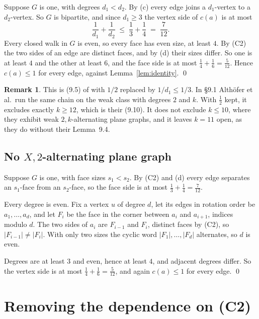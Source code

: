 \documentclass[11pt,a4paper]{amsart}
\theoremstyle{plain}
\theoremstyle{definition}
\newtheorem{remark}[theorem]{Remark}
\begin{document}
Suppose $G$ is one, with degrees $d_1 < d_2$. By (c) every edge joins a
$d_1$-vertex to a $d_2$-vertex. So $G$ is bipartite, and since $d_1 \ge 3$ the
vertex side of $c(a)$ is at most
\[
  \frac{1}{d_1} + \frac{1}{d_2} \;\le\; \frac13 + \frac14 \;=\; \frac{7}{12}.
\]
Every closed walk in $G$ is even, so every face has even size, at least $4$. By
(C2) the two sides of an edge are distinct faces, and by (d) their sizes differ.
So one is at least $4$ and the other at least $6$, and the face side is at most
$\tfrac14 + \tfrac16 = \tfrac{5}{12}$. Hence $c(a) \le 1$ for every edge,
against Lemma~\ref{lem:identity}. \qed

\begin{remark}
This is (9.5) of \cite{AHSSV2015} with $1/2$ replaced by $1/d_1 \le 1/3$. In
\S9.1 Alth\"ofer et al.\ run the same chain on the weak class with degrees $2$
and $k$. With $\tfrac12$ kept, it excludes exactly $k \ge 12$, which is their
(9.10). It does not exclude $k \le 10$, where they exhibit weak
$2,k$-alternating plane graphs, and it leaves $k = 11$ open, as they do without
their Lemma~9.4.
\end{remark}

\subsection{No $X,2$-alternating plane graph}\label{sec:halftwo}

Suppose $G$ is one, with face sizes $s_1 < s_2$. By (C2) and (d) every edge
separates an $s_1$-face from an $s_2$-face, so the face side is at most
$\tfrac13 + \tfrac14 = \tfrac{7}{12}$.

Every degree is even. Fix a vertex $u$ of degree $d$, let its edges in rotation
order be $a_1,\dots,a_d$, and let $F_i$ be the face in the corner between $a_i$
and $a_{i+1}$, indices modulo $d$. The two sides of $a_i$ are $F_{i-1}$ and
$F_i$, distinct faces by (C2), so $|F_{i-1}| \ne |F_i|$. With only two sizes
the cyclic word $|F_1|,\dots,|F_d|$ alternates, so $d$ is even.

Degrees are at least $3$ and even, hence at least $4$, and adjacent degrees
differ. So the vertex side is at most $\tfrac14+\tfrac16 = \tfrac{5}{12}$, and
again $c(a) \le 1$ for every edge. \qed

\section{Removing the dependence on (C2)}\label{sec:c2}
\end{document}
